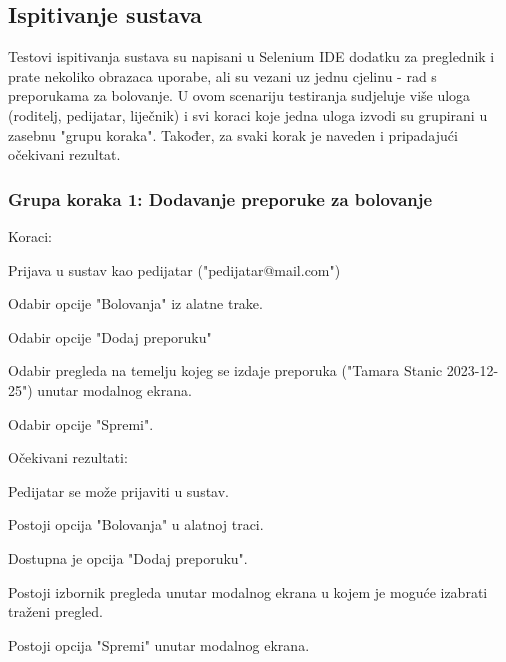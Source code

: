 			\subsection{Ispitivanje sustava}
			Testovi ispitivanja sustava su napisani u Selenium IDE dodatku za preglednik i prate nekoliko obrazaca uporabe, ali su vezani uz jednu cjelinu - rad s preporukama za bolovanje.
			U ovom scenariju testiranja sudjeluje više uloga (roditelj, pedijatar, liječnik) i svi koraci koje jedna uloga izvodi su grupirani u zasebnu "grupu koraka". Također, za svaki korak je
			naveden i pripadajući očekivani rezultat.
			
			 \subsubsection*{Grupa koraka 1: Dodavanje preporuke za bolovanje}
			 Koraci:
			 \begin{packed_enum}
				\item Prijava u sustav kao pedijatar ("pedijatar@mail.com")
				\item Odabir opcije "Bolovanja" iz alatne trake.
				\item Odabir opcije "Dodaj preporuku"
				\item Odabir pregleda na temelju kojeg se izdaje preporuka ("Tamara Stanic 2023-12-25") unutar modalnog ekrana.
				\item Odabir opcije "Spremi".
			 \end{packed_enum}
			 Očekivani rezultati:
			 \begin{packed_enum}
				\item Pedijatar se može prijaviti u sustav.
				\item Postoji opcija "Bolovanja" u alatnoj traci.
				\item Dostupna je opcija "Dodaj preporuku".
				\item Postoji izbornik pregleda unutar modalnog ekrana u kojem je moguće izabrati traženi pregled.
				\item Postoji opcija "Spremi" unutar modalnog ekrana.
			 \end{packed_enum}
	
